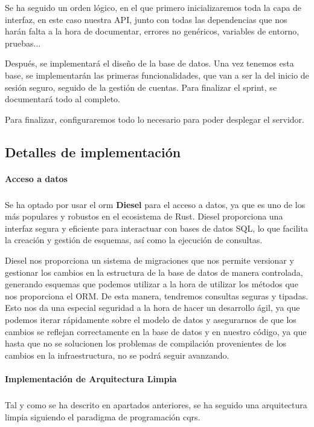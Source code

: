 Se ha seguido un orden lógico, en el que primero inicializaremos toda la capa de interfaz, en este caso nuestra API, junto con todas las dependencias que nos harán falta a la hora de documentar, errores no genéricos, variables de entorno, pruebas...

Después, se implementará el diseño de la base de datos. Una vez tenemos esta base, se implementarán las primeras funcionalidades, que van a ser la del inicio de sesión seguro, seguido de la gestión de cuentas. Para finalizar el sprint, se documentará todo al completo.

Para finalizar, configuraremos todo lo necesario para poder desplegar el servidor.

\subsection{Detalles de implementación}

\paragraph{Acceso a datos}
\subparagraph{}
Se ha optado por usar el \acrshort{orm} \textbf{Diesel} para el acceso a datos, ya que es uno de los más populares y robustos en el ecosistema de Rust. Diesel proporciona una interfaz segura y eficiente para interactuar con bases de datos SQL, lo que facilita la creación y gestión de esquemas, así como la ejecución de consultas.

Diesel nos proporciona un sistema de migraciones que nos permite versionar y gestionar los cambios en la estructura de la base de datos de manera controlada, generando esquemas que podemos utilizar a la hora de utilizar los métodos que nos proporciona el ORM. De esta manera, tendremos consultas seguras y tipadas.
Esto nos da una especial seguridad a la hora de hacer un desarrollo ágil, ya que podemos iterar rápidamente sobre el modelo de datos y asegurarnos de que los cambios se reflejan correctamente en la base de datos y en nuestro código, ya que hasta que no se solucionen los problemas de compilación provenientes de los cambios en la infraestructura, no se podrá seguir avanzando.

\paragraph{Implementación de Arquitectura Limpia}
\subparagraph{}

Tal y como se ha descrito en apartados anteriores, se ha seguido una arquitectura limpia siguiendo el paradigma de programación \acrshort{cqrs}.

